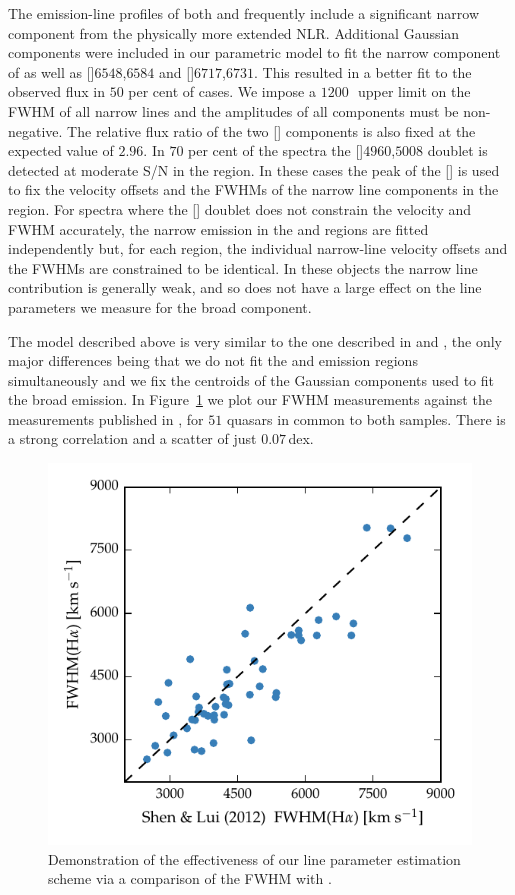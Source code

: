 The emission-line profiles of both \hb and \ha frequently include a significant narrow component from the physically more extended NLR. 
Additional Gaussian components were included in our parametric model to fit the narrow component of \ha as well as []\ll$6548$,$6584$ and []\ll$6717$,$6731$.
This resulted in a better fit to the observed flux in $50$ per cent of cases. 
We impose a $1200$\,\kms\, upper limit on the FWHM of all narrow lines and the amplitudes of all components must be non-negative.
The relative flux ratio of the two [] components is also fixed at the expected value of $2.96$.
In $70$ per cent of the spectra the []\ll$4960$,$5008$ doublet is detected at moderate S/N in the \hb region. 
In these cases the peak of the [] is used to fix the velocity offsets and the FWHMs of the narrow line components in the \ha region.  
For spectra where the [] doublet does not constrain the velocity and FWHM accurately, the narrow emission in the \ha and \hb regions are fitted independently but, for each region, the individual narrow-line velocity offsets and the FWHMs are constrained to be identical. 
In these objects the narrow line contribution is generally weak, and so does not have a large effect on the line parameters we measure for the broad component.   

The model described above is very similar to the one described in \citet{shen12} and \citet{shen11}, the only major differences being that we do not fit the \ha and \hb emission regions simultaneously and we fix the centroids of the Gaussian components used to fit the broad emission.
In Figure~\ref{fig:shen_comparison_ha} we plot our \ha FWHM measurements against the measurements published in \citet{shen12}, for $51$ quasars in common to both samples.
There is a strong correlation and a scatter of just $0.07$\,dex. 

\begin{figure}
    \centering 
    \includegraphics[width=0.8\linewidth]{figures/chapter03/shen_comparison_ha.pdf} 
    \caption{Demonstration of the effectiveness of our line parameter estimation scheme via a comparison of the \ha FWHM with \citet{shen12}.} 
    \label{fig:shen_comparison_ha}
\end{figure}

